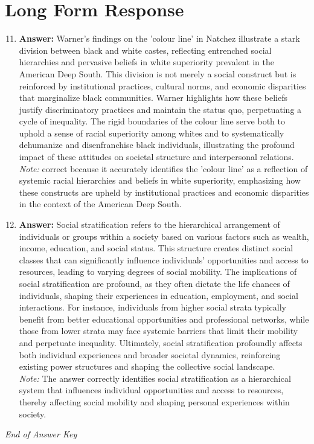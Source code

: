 \documentclass[12pt]{article}
\begin{document}
\section*{Long Form Response}
\begin{enumerate}[label=\arabic*.]
\setcounter{enumi}{10}
\item \textbf{Answer:} Warner's findings on the 'colour line' in Natchez illustrate a stark division between black and white castes, reflecting entrenched social hierarchies and pervasive beliefs in white superiority prevalent in the American Deep South. This division is not merely a social construct but is reinforced by institutional practices, cultural norms, and economic disparities that marginalize black communities. Warner highlights how these beliefs justify discriminatory practices and maintain the status quo, perpetuating a cycle of inequality. The rigid boundaries of the colour line serve both to uphold a sense of racial superiority among whites and to systematically dehumanize and disenfranchise black individuals, illustrating the profound impact of these attitudes on societal structure and interpersonal relations.
\\ \textit{Note:} correct because it accurately identifies the 'colour line' as a reflection of systemic racial hierarchies and beliefs in white superiority, emphasizing how these constructs are upheld by institutional practices and economic disparities in the context of the American Deep South.
\item \textbf{Answer:} Social stratification refers to the hierarchical arrangement of individuals or groups within a society based on various factors such as wealth, income, education, and social status. This structure creates distinct social classes that can significantly influence individuals' opportunities and access to resources, leading to varying degrees of social mobility. The implications of social stratification are profound, as they often dictate the life chances of individuals, shaping their experiences in education, employment, and social interactions. For instance, individuals from higher social strata typically benefit from better educational opportunities and professional networks, while those from lower strata may face systemic barriers that limit their mobility and perpetuate inequality. Ultimately, social stratification profoundly affects both individual experiences and broader societal dynamics, reinforcing existing power structures and shaping the collective social landscape.
\\ \textit{Note:} The answer correctly identifies social stratification as a hierarchical system that influences individual opportunities and access to resources, thereby affecting social mobility and shaping personal experiences within society.
\end{enumerate}

\vfill
\noindent\textit{End of Answer Key}
\end{document}
